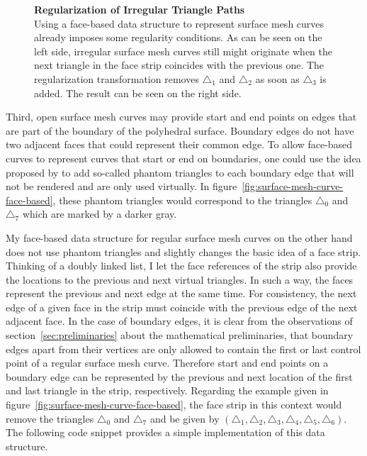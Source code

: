 \documentclass{stdlocal}
\begin{document}
\begin{figure}
\begin{subfigure}[c]{0.38\linewidth}
    \end{subfigure}
    \caption[Regularization of Irregular Triangle Paths]{
      \textbf{Regularization of Irregular Triangle Paths}\\
      Using a face-based data structure to represent surface mesh curves already imposes some regularity conditions.
      As can be seen on the left side, irregular surface mesh curves still might originate when the next triangle in the face strip coincides with the previous one.
      The regularization transformation removes $\triangle_1$ and $\triangle_2$ as soon as $\triangle_3$ is added.
      The result can be seen on the right side.
    }
    \label{fig:surface-mesh-curves-face-based-regularization}
  \end{figure}

  Third, open surface mesh curves may provide start and end points on edges that are part of the boundary of the polyhedral surface.
  Boundary edges do not have two adjacent faces that could represent their common edge.
  To allow face-based curves to represent curves that start or end on boundaries, one could use the idea proposed by \textcite{shewchuk1996} to add so-called phantom triangles to each boundary edge that will not be rendered and are only used virtually.
  In figure~\ref{fig:surface-mesh-curve-face-based}, these phantom triangles would correspond to the triangles $\triangle_0$ and $\triangle_7$ which are marked by a darker gray.

  My face-based data structure for regular surface mesh curves on the other hand does not use phantom triangles and slightly changes the basic idea of a face strip.
  Thinking of a doubly linked list, I let the face references of the strip also provide the locations to the previous and next virtual triangles.
  In such a way, the faces represent the previous and next edge at the same time.
  For consistency, the next edge of a given face in the strip must coincide with the previous edge of the next adjacent face.
  In the case of boundary edges, it is clear from the observations of section~\ref{sec:preliminaries} about the mathematical preliminaries, that boundary edges apart from their vertices are only allowed to contain the first or last control point of a regular surface mesh curve.
  Therefore start and end points on a boundary edge can be represented by the previous and next location of the first and last triangle in the strip, respectively.
  Regarding the example given in figure~\ref{fig:surface-mesh-curve-face-based}, the face strip in this context would remove the triangles $\triangle_0$ and $\triangle_7$ and be given by $(\triangle_1,\triangle_2,\triangle_3,\triangle_4,\triangle_5,\triangle_6)$.
  The following code snippet provides a simple implementation of this data structure.
\end{document}
